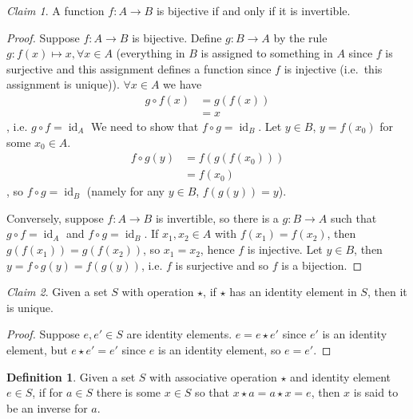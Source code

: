 \documentclass[12pt,letterpaper,DIV=11,final]{scrartcl}
\theoremstyle{plain}
\theoremstyle{definition}
\newtheorem{definition}{Definition}[section]
\theoremstyle{remark}
\newtheorem{claim}{Claim}
\DeclareMathOperator{\id}{id}
\begin{document}
\begin{claim}
  A function $f: A \to B$ is bijective if and only if it is invertible.

  \begin{proof}
    Suppose $f: A \to B$ is bijective.
    Define $g: B \to A$ by the rule $g: f(x) \mapsto x, \forall x \in A$
    (everything in $B$ is assigned to something in $A$ since $f$ is surjective and this assignment defines a function since $f$ is injective (i.e.\ this assignment is unique)).
    $\forall x \in A$ we have
    \begin{align*}
      g \circ f(x) &= g(f(x)) \\
                   &= x
    \end{align*}, i.e. $g \circ f = \id_A$
    We need to show that $f \circ g = \id_B$.
    Let $y \in B$, $y = f(x_0)$ for some $x_0 \in A$.
    \begin{align*}
      f \circ g(y) &= f(g(f(x_0))) \\
                   &= f(x_0)
    \end{align*}, so $f \circ g = \id_B$ (namely for any $y \in B$, $f(g(y)) = y$).

    Conversely, suppose $f: A \to B$ is invertible, so there is a $g: B \to A$ such that $g \circ f = \id_A$ and $f \circ g = \id_B$.
    If $x_1, x_2 \in A$ with $f(x_1) = f(x_2)$, then $g(f(x_1)) = g(f(x_2))$, so $x_1 = x_2$, hence $f$ is injective.
    Let $y \in B$, then $y = f \circ g(y) = f(g(y))$, i.e. $f$ is surjective and so $f$ is a bijection.
  \end{proof}
\end{claim}

\begin{claim}\label{claim:uniqueidentity}
  Given a set $S$ with operation $\star$, if $\star$ has an identity element in $S$, then it is unique.

  \begin{proof}
    Suppose $e, e' \in S$ are identity elements.
    $e = e \star e'$ since $e'$ is an identity element, but $e \star e' = e'$ since $e$ is an identity element, so $e = e'$.
  \end{proof}
\end{claim}

\begin{definition}
  Given a set $S$ with associative operation $\star$ and identity element $e \in S$, if for $a \in S$ there is some $x \in S$ so that $x \star a = a \star x = e$, then $x$ is said to be an inverse for $a$.
\end{definition}
\end{document}
